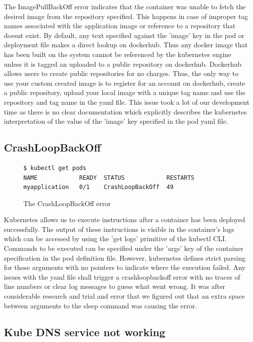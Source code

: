 \documentclass[9pt,twocolumn,twoside]{../../styles/osajnl}
\begin{document}
{The ImagePullBackOff error indicates that the container was unable to
fetch the desired image from the repository specified. This happens in
case of improper tag names associated with the application image or
reference to a repository that doesnt exist. By default, any text
specified against the 'image' key in the pod or deployment file makes
a direct lookup on dockerhub. Thus any docker image that has been
built on the system cannot be referenced by the kubernetes engine
unless it is tagged an uploaded to a public repository on
dockerhub. Dockerhub allows users to create public repositories for no
charges. Thus, the only way to use your custom created image is to
register for an account on dockerhub, create a public repository,
upload your local image with a unique tag name and use the repository
and tag name in the yaml file. This issue took a lot of our
development time as there is no clear documentation which explicitly
describes the kubernetes interpretation of the value of the 'image'
key specified in the pod yaml file.

\subsection{CrashLoopBackOff}
\begin{figure}[H]
\begin{verbatim}
$ kubectl get pods
NAME            READY  STATUS            RESTARTS  
myapplication   0/1    CrashLoopBackOff  49
\end{verbatim}
\caption{The CrashLoopBackOff error}
\vspace{-3mm}
\label{The CrashLoopBackOff error}
\end{figure}
Kubernetes allows us to execute instructions after a container has
been deployed successfully. The output of these instructions is
visible in the container's logs which can be accessed by using the
'get logs' primitive of the kubectl CLI. Commands to be executed can
be specified under the 'args' key of the container specification in
the pod definition file. However, kubernetes defines strict parsing
for those arguments with no pointers to indicate where the execution
failed. Any issues with the yaml file shall trigger a crashloopbackoff
error with no traces of line numbers or clear log messages to guess
what went wrong. It was after considerable research and trial and
error that we figured out that an extra space between arguments to the
sleep command was causing the error.


\subsection{Kube DNS service not working}

}
\end{document}
